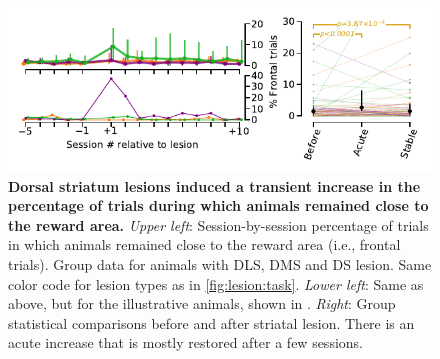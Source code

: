 \begin{figure}[h!]
	\begin{center}
		\includegraphics[scale=1]{ch-appendicies/figures/FrontalTrials.pdf}
		\caption[Frontal Trials After Striatal Lesion]
		{\textbf{Dorsal striatum lesions induced a transient increase in the percentage of trials during which animals remained close to the reward area.}
		\textit{Upper left}: Session-by-session percentage of trials in which animals remained close to the reward area (i.e., frontal trials).
		Group data for animals with DLS, DMS and DS lesion.
		Same color code for lesion types as in \autoref{fig:lesion:task}.
		\textit{Lower left}: Same as above, but for the illustrative animals, shown in .
		\textit{Right}: Group statistical comparisons before and after striatal lesion.
		There is an acute increase that is mostly restored after a few sessions.		
		}
		\label{fig:appendix:Frontal}
	\end{center}
\end{figure}